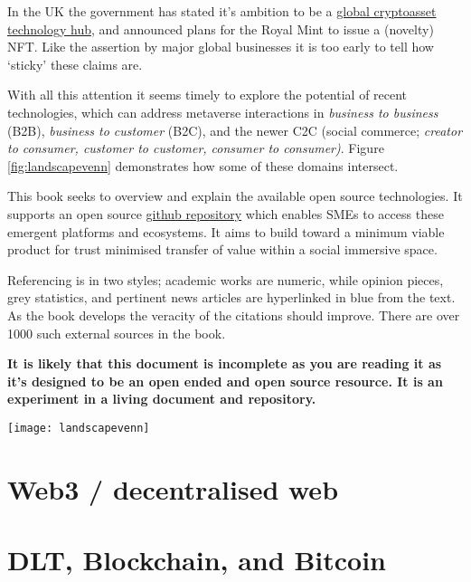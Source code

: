 \documentclass[
	12pt, %
	fleqn, %
	a4paper, %
	oneside, %
]{LegrandOrangeBook}
\begin{document}
In the UK the government has stated it's ambition to be a \href{https://www.gov.uk/government/news/government-sets-out-plan-to-make-uk-a-global-cryptoasset-technology-hub}{global cryptoasset technology hub}, and announced plans for the Royal Mint to issue a (novelty) NFT. Like the assertion by major global businesses it is too early to tell how `sticky' these claims are.\par
With all this attention it seems timely to explore the potential of recent technologies, which can address metaverse interactions in \textit{business to business} (B2B), \textit{business to customer} (B2C), and the newer C2C (social commerce; \textit{creator to consumer, customer to customer, consumer to consumer\cite{jones2008trust})}. Figure \ref{fig:landscapevenn} demonstrates how some of these domains intersect.\par
This book seeks to overview and explain the available open source technologies. It supports an open source \href{https://github.com/GMCyberFoundry/Metaverse}{github repository} which enables SMEs to access these emergent platforms and ecosystems. It aims to build toward a minimum viable product for trust minimised transfer of value within a social immersive space.\par
Referencing is in two styles; academic works are numeric, while opinion pieces, grey statistics, and pertinent news articles are hyperlinked in blue from the text. As the book develops the veracity of the citations should improve. There are over 1000 such external sources in the book.\par 
\textbf{It is likely that this document is incomplete as you are reading it as it's designed to be an open ended and open source resource. It is an experiment in a living document and repository.}

\begin{figure*}[ht]\centering %
	\texttt{[image: landscapevenn]}
	\caption{Web 3, Metaverse, and Bitcoin are inter-sectional technologies.}
	\label{fig:landscapevenn}
\end{figure*}
\chapter{Web3 / decentralised web}


\chapter{DLT, Blockchain, and Bitcoin}

\end{document}
